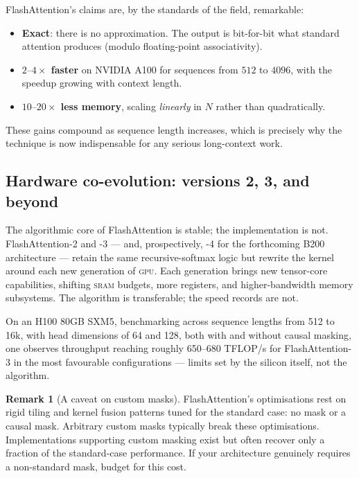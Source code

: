 \documentclass[11pt,a4paper]{article}
\theoremstyle{definition}
\newtheorem{remark}[definition]{Remark}
\theoremstyle{plain}
\newcommand{\SRAM}{\textsc{sram}}
\newcommand{\GPU}{\textsc{gpu}}
\begin{document}
FlashAttention's claims are, by the standards of the field, remarkable:
\begin{itemize}[leftmargin=*,itemsep=2pt]
    \item \textbf{Exact}: there is no approximation. The output is bit-for-bit what standard attention produces (modulo floating-point associativity).
    \item \textbf{$2\text{--}4\times$ faster} on NVIDIA A100 for sequences from $512$ to $4096$, with the speedup growing with context length.
    \item \textbf{$10\text{--}20\times$ less memory}, scaling \emph{linearly} in $N$ rather than quadratically.
\end{itemize}
These gains compound as sequence length increases, which is precisely why the technique is now indispensable for any serious long-context work.

\subsection{Hardware co-evolution: versions 2, 3, and beyond}

The algorithmic core of FlashAttention is stable; the implementation is not. FlashAttention-2 and -3 --- and, prospectively, -4 for the forthcoming B200 architecture --- retain the same recursive-softmax logic but rewrite the kernel around each new generation of \GPU{}. Each generation brings new tensor-core capabilities, shifting \SRAM{} budgets, more registers, and higher-bandwidth memory subsystems. The algorithm is transferable; the speed records are not.

On an H100 80GB SXM5, benchmarking across sequence lengths from 512 to 16k, with head dimensions of 64 and 128, both with and without causal masking, one observes throughput reaching roughly 650--680 TFLOP/s for FlashAttention-3 in the most favourable configurations --- limits set by the silicon itself, not the algorithm.

\begin{remark}[A caveat on custom masks]
FlashAttention's optimisations rest on rigid tiling and kernel fusion patterns tuned for the standard case: no mask or a causal mask. Arbitrary custom masks typically break these optimisations. Implementations supporting custom masking exist but often recover only a fraction of the standard-case performance. If your architecture genuinely requires a non-standard mask, budget for this cost.
\end{remark}
\end{document}
